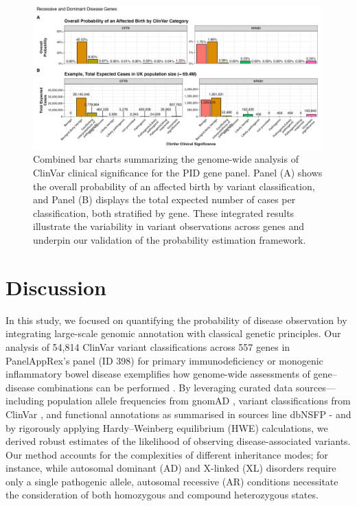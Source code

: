 \begin{figure}[ht]
  \centering
  \includegraphics[width=0.99\textwidth]{../images/all_genes_combined_bar_charts_mini.png}
  \caption{Combined bar charts summarizing the genome-wide analysis of ClinVar clinical significance for the PID gene panel. Panel (A) shows the overall probability of an affected birth by variant classification, and Panel (B) displays the total expected number of cases per classification, both stratified by gene. These integrated results illustrate the variability in variant observations across genes and underpin our validation of the probability estimation framework.}
  \label{fig:all_genes_combined_bar_charts_mini}
\end{figure}

\FloatBarrier
\section{Discussion}

In this study, we focused on quantifying the probability of disease observation by integrating large-scale genomic annotation with classical genetic principles. Our analysis of 54,814 ClinVar variant classifications across 557 genes in PanelAppRex’s panel (ID 398) for primary immunodeficiency or monogenic inflammatory bowel disease exemplifies how genome-wide assessments of gene–disease combinations can be performed \cite{lawless_panelapprex_2025}. By leveraging curated data sources—including population allele frequencies from gnomAD
\cite{karczewski2020mutational}, variant classifications from ClinVar \cite{landrum_clinvar_2018}, and functional annotations as summarised in sources line dbNSFP - and by rigorously applying Hardy–Weinberg equilibrium (HWE) calculations, we derived robust estimates of the likelihood of observing disease-associated variants. Our method accounts for the complexities of different inheritance modes; for instance, while autosomal dominant (AD) and X-linked (XL) disorders require only a single pathogenic allele, autosomal recessive (AR) conditions necessitate the consideration of both homozygous and compound heterozygous states.

